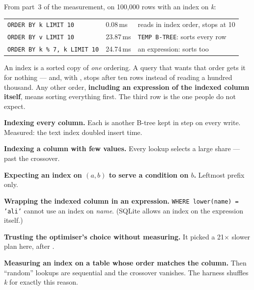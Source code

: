 \begin{examplebox}
From part~3 of the measurement, on 100{,}000 rows with an index on \textit{k}:

\medskip
\begin{tabular}{@{}L{6.4cm}R{2.0cm}L{5.4cm}@{}}
\texttt{ORDER BY k LIMIT 10} & 0.08\,ms & reads in index order, stops at 10 \\
\texttt{ORDER BY v LIMIT 10} & 23.87\,ms & \texttt{TEMP B-TREE}: sorts every row \\
\texttt{ORDER BY k \% 7, k LIMIT 10} & 24.74\,ms & an expression: sorts too \\
\end{tabular}

\smallskip
An index is a sorted copy of \emph{one} ordering. A query that wants that
order gets it for nothing --- and, with , stops after ten rows
instead of reading a hundred thousand. Any other order, \textbf{including an
expression of the indexed column itself}, means sorting everything first. The
third row is the one people do not expect.
\end{examplebox}

\begin{pitfall}
\begin{tight}
  \item \textbf{Indexing every column.} Each is another B-tree kept in step
        on every write. Measured: the text index doubled insert time.
  \item \textbf{Indexing a column with few values.} Every lookup selects a
        large share --- past the crossover.
  \item \textbf{Expecting an index on $(a, b)$ to serve a condition on $b$.}
        Leftmost prefix only.
  \item \textbf{Wrapping the indexed column in an expression.}
        \texttt{WHERE lower(name) = 'ali'} cannot use an index on
        \textit{name}. (SQLite allows an index on the expression itself.)
  \item \textbf{Trusting the optimiser's choice without measuring.} It picked
        a 21$\times$ slower plan here, after .
  \item \textbf{Measuring an index on a table whose order matches the
        column.} Then ``random'' lookups are sequential and the crossover
        vanishes. The harness shuffles \textit{k} for exactly this reason.
\end{tight}
\end{pitfall}

